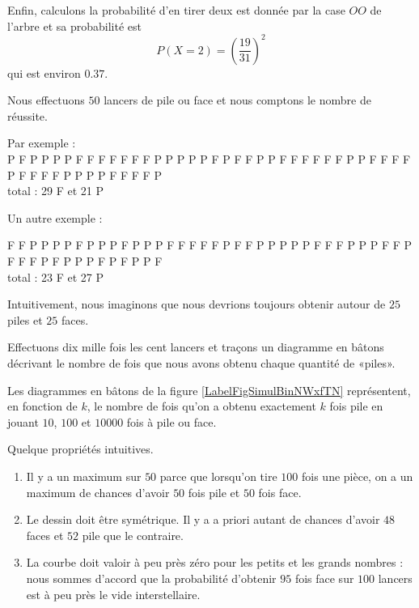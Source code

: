 Enfin, calculons la probabilité d'en tirer deux est donnée par la case \( OO\) de l'arbre et sa probabilité est
\begin{equation}
    P(X=2)=\left( \frac{ 19 }{ 31 } \right)^2
\end{equation}
qui est environ \( 0.37\).


\begin{example}
Nous effectuons \( 50\) lancers de pile ou face et nous comptons le nombre de réussite.

Par exemple :\\
P F P P P P F F F F F F F P P P P P F P F F P P F F F F F F P P F F F F P F F F F P P P P F F F F P \\
 total : 29 F et  21 P
 
Un autre exemple :

F F P P P P F P P P F P P P F F F F F P F F P P P P P F F F P P P F F P F F F P F P P P F P F P P F \\
 total : 23 F et  27 P

 Intuitivement, nous imaginons que nous devrions toujours obtenir autour de \( 25\) piles et \( 25\) faces.
    
\end{example}

\begin{example}

Effectuons dix mille fois les cent lancers et traçons un diagramme en bâtons décrivant le nombre de fois que nous avons obtenu chaque quantité de «piles».

Les diagrammes en bâtons de la figure \ref{LabelFigSimulBinNWxfTN} %
représentent, en fonction de \( k\), le nombre de fois qu'on a obtenu exactement \( k\) fois pile en jouant \( 10\), \( 100\) et \( 10000\) fois à pile ou face.
\newcommand{\CaptionFigSimulBinNWxfTN}{Jouer à pile ou face un certain nombre de fois, et s'intéresser au nombre de fois que le «pile» sort.}



Quelque propriétés intuitives.
\begin{enumerate}
    \item
        Il y a un maximum sur \( 50\) parce que lorsqu'on tire \( 100\) fois une pièce, on a un maximum de chances d'avoir \( 50\) fois pile et \( 50\) fois face.
    \item
        Le dessin doit être symétrique. Il y a a priori autant de chances d'avoir \( 48\) faces et \( 52\) pile que le contraire.
    \item
        La courbe doit valoir à peu près zéro pour les petits et les grands nombres : nous sommes d'accord que la probabilité d'obtenir \( 95\) fois face sur \( 100\) lancers est à peu près le vide interstellaire.
\end{enumerate}
    
\end{example}

